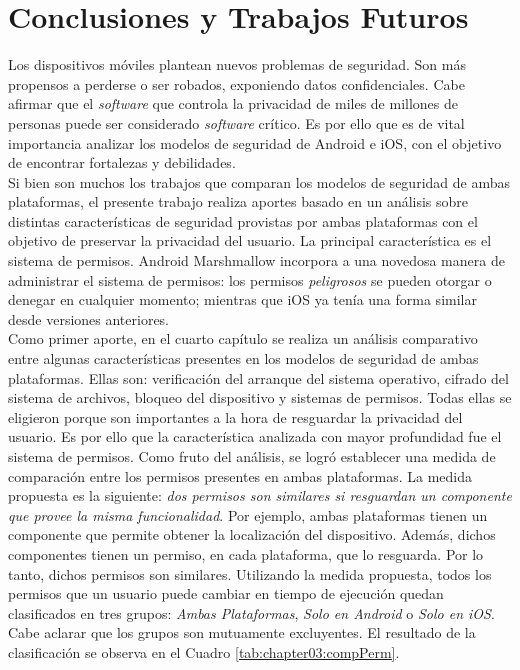 \chapter{Conclusiones y Trabajos Futuros}
Los dispositivos móviles plantean nuevos problemas de seguridad. Son más propensos a perderse o ser robados, exponiendo datos confidenciales. Cabe afirmar que el \emph{software} que controla la privacidad de miles de millones de personas puede ser considerado \emph{software} crítico. Es por ello que es de vital importancia analizar los modelos de seguridad de Android e iOS, con el objetivo de encontrar fortalezas y debilidades.\\

Si bien son muchos los trabajos que comparan los modelos de seguridad de ambas plataformas, el presente trabajo realiza aportes basado en un análisis sobre distintas características de seguridad provistas por ambas plataformas con el objetivo de preservar la privacidad del usuario. La principal característica es el sistema de permisos. Android Marshmallow incorpora a una novedosa manera de administrar el sistema de permisos: los permisos \emph{peligrosos} se pueden otorgar o denegar en cualquier momento; mientras que iOS ya tenía una forma similar desde versiones anteriores.\\

Como primer aporte, en el cuarto capítulo se realiza un análisis comparativo entre algunas características presentes en los modelos de seguridad de ambas plataformas. Ellas son: verificación del arranque del sistema operativo, cifrado del sistema de archivos, bloqueo del dispositivo y sistemas de permisos. Todas ellas se eligieron porque son importantes a la hora de resguardar la privacidad del usuario. Es por ello que la característica analizada con mayor profundidad fue el sistema de permisos. Como fruto del análisis, se logró establecer una medida de comparación entre los permisos presentes en ambas plataformas. La medida propuesta es la siguiente: \emph{dos permisos son similares si resguardan un componente que provee la misma funcionalidad}. Por ejemplo, ambas plataformas tienen un componente que permite obtener la localización del dispositivo. Además, dichos componentes tienen un permiso, en cada plataforma, que lo resguarda. Por lo tanto, dichos permisos son similares. Utilizando la medida propuesta, todos los permisos que un usuario puede cambiar en tiempo de ejecución quedan clasificados en tres grupos: \emph{Ambas Plataformas}, \emph{Solo en Android} o \emph{Solo en iOS}. Cabe aclarar que los grupos son mutuamente excluyentes. El resultado de la clasificación se observa en el Cuadro \ref{tab:chapter03:compPerm}.\\ 

